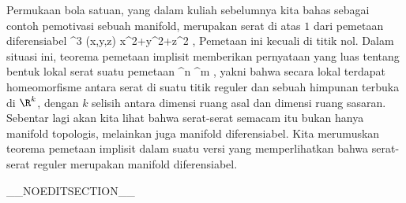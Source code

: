 \setcounter{section}{8}


Permukaan bola satuan, yang dalam kuliah sebelumnya kita bahas sebagai contoh pemotivasi sebuah manifold, merupakan serat di atas $1$ dari pemetaan diferensiabel
\maabbeledisp {} { \R^3 } { \R
} { (x,y,z) } { x^2+y^2+z^2
} {,}
Pemetaan ini
kecuali di titik nol. Dalam situasi ini, teorema pemetaan implisit memberikan pernyataan yang luas tentang bentuk lokal serat suatu pemetaan
\maabb {\varphi} {\R^n} { \R^m
} {,}
yakni bahwa secara lokal terdapat homeomorfisme antara serat di suatu titik reguler dan sebuah himpunan terbuka di $\R^k$, dengan $k$ selisih antara dimensi ruang asal dan dimensi ruang sasaran. Sebentar lagi akan kita lihat bahwa serat-serat semacam itu bukan hanya manifold topologis, melainkan juga manifold diferensiabel. Kita merumuskan teorema pemetaan implisit dalam suatu versi yang memperlihatkan bahwa serat-serat reguler merupakan manifold diferensiabel.

__NOEDITSECTION__

